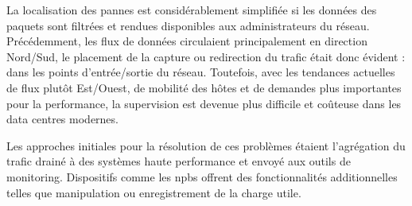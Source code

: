 La localisation des pannes est considérablement simplifiée si les données des paquets sont filtrées et rendues disponibles aux administrateurs du réseau. Précédemment, les flux de données circulaient principalement en direction Nord/Sud, le placement de la capture ou redirection du trafic était donc évident : dans les points d'entrée/sortie du réseau. Toutefois, avec les tendances actuelles de flux plutôt Est/Ouest, de mobilité des hôtes et de demandes plus importantes pour la performance, la supervision est devenue plus difficile et coûteuse dans les data centres modernes.

Les approches initiales pour la résolution de ces problèmes étaient l'agrégation du trafic drainé à des systèmes haute performance et envoyé aux outils de monitoring. Dispositifs comme les \glspl{npb} offrent des fonctionnalités additionnelles telles que manipulation ou enregistrement de la charge utile. 

